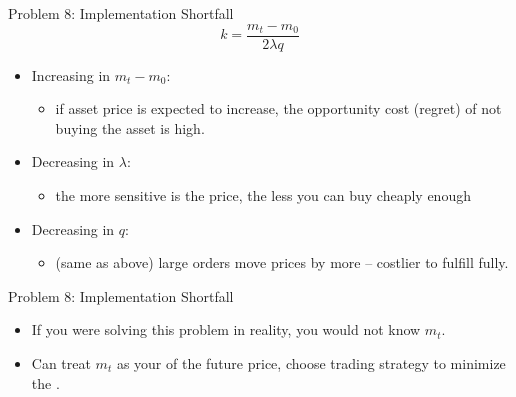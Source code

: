 \begin{frame}{Problem 8: Implementation Shortfall}
	$$ k = \frac{m_t - m_0}{2\lambda q} $$
	\begin{itemize}
		\item Increasing in $m_t - m_0$:
		\begin{itemize}
			\item if asset price is expected to increase, the opportunity cost (regret) of not buying the asset is high.
		\end{itemize}
		\item Decreasing in $\lambda$:
		\begin{itemize}
			\item the more sensitive is the price, the less you can buy cheaply enough
		\end{itemize}
		\item Decreasing in $q$:
		\begin{itemize}
			\item (same as above) large orders move prices by more -- costlier to fulfill fully.
		\end{itemize}
	\end{itemize}
\end{frame}


\begin{frame}{Problem 8: Implementation Shortfall}
	\begin{itemize}
		\item If you were solving this problem in reality, you would not know $m_t$.
		\item Can treat $m_t$ as your  of the future price, choose trading strategy to minimize the .
	\end{itemize}
\end{frame}

 